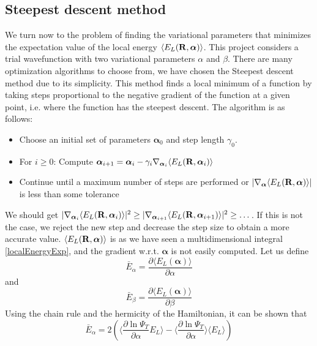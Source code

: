 \documentclass[english, a4paper]{article}
\begin{document}
\subsection{Steepest descent method}

We turn now to the problem of finding the variational parameters that minimizes the expectation value
of the local energy $\langle E_L({\bf R}, \boldsymbol{\alpha}) \rangle$. This project considers a trial wavefunction
with two variational parameters $\alpha$ and  $\beta$. 
There are many optimization algorithms to choose from, we have chosen the Steepest 
descent method due to its simplicity. This method finds a local minimum of a function by taking steps proportional 
to the negative gradient of the function at a given point, i.e. where the function has the steepest descent.
The algorithm is as follows:
\begin{itemize}
 \item Choose an initial set of parameters $\boldsymbol{\alpha}_0$ and step length $\gamma_0$.
 \item For $i \geq 0$: Compute $\boldsymbol{\alpha}_{i+1} = \boldsymbol{\alpha}_i - \gamma_i 
 \nabla_{\boldsymbol{\alpha}_i} \langle E_L({\bf R}, \boldsymbol{\alpha}_i) \rangle$
 \item Continue until a maximum number of steps are performed or 
 $|\nabla_{\boldsymbol{\alpha}} \langle E_L({\bf R}, \boldsymbol{\alpha}) \rangle|$ is
       less than some tolerance
\end{itemize}
We should get $|\nabla_{\boldsymbol{\alpha}_i}\langle E_L({\bf R}, 
\boldsymbol{\alpha}_i) \rangle|^2 \geq |\nabla_{\boldsymbol{\alpha}_{i+1}}\langle 
E_L({\bf R}, \boldsymbol{\alpha}_{i+1}) \rangle|^2 \geq \dots$.
If this is not the case, we reject the new step and decrease the step size to obtain a more
accurate value. 
$\langle E_L({\bf R}, \boldsymbol{\alpha}) \rangle$ is as we have seen a multidimensional integral \eqref{localEnergyExp}, 
and the gradient w.r.t. $\boldsymbol{\alpha}$
is not easily computed. Let us define
\begin{equation}
 \bar{E}_\alpha = \frac{\partial \langle E_L(\boldsymbol{\alpha}) \rangle}{\partial \alpha}
\end{equation}
and 
\begin{equation}
 \bar{E}_\beta = \frac{\partial \langle E_L(\boldsymbol{\alpha}) \rangle}{\partial \beta}
\end{equation}
Using the chain rule and the hermicity of the Hamiltonian,
it can be shown that
\begin{equation}
 \bar{E}_\alpha = 2 \left( \Bigr\langle \frac{\partial \ln{\Psi_T}}{\partial \alpha} E_L 
 \Bigr\rangle 
 - \Bigr\langle \frac{\partial \ln{\Psi_T}}{\partial \alpha}\Bigr\rangle \langle E_L \rangle   \right)
 \label{localenergyalpha}
\end{equation}
\end{document}
